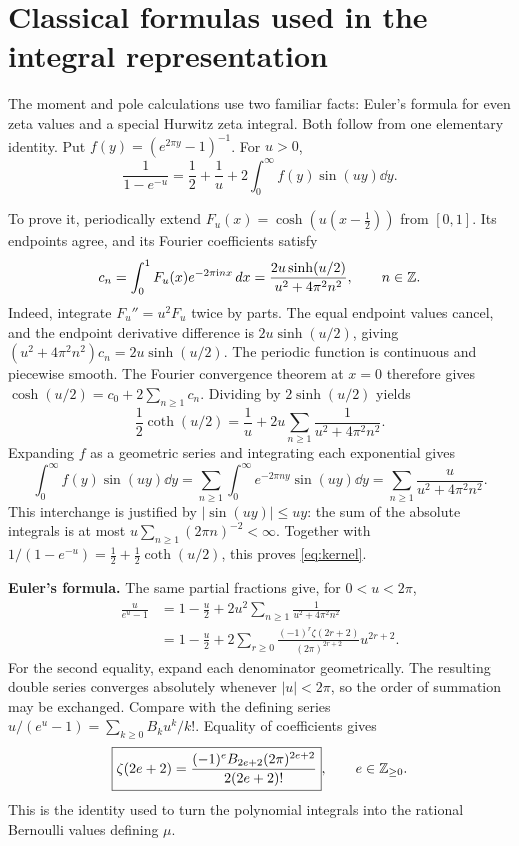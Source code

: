 \section{Classical formulas used in the integral representation}\label{app:classical}

The moment and pole calculations use two familiar facts: Euler's formula
for even zeta values and a special Hurwitz zeta integral. Both follow from
one elementary identity. Put $f(y)=(e^{2\pi y}-1)^{-1}$. For $u>0$,
\begin{equation}\label{eq:kernel}
 \frac1{1-e^{-u}}=\frac12+\frac1u
       +2\int_0^\infty f(y)\sin(uy)\dd y.
\end{equation}

To prove it, periodically extend
$F_u(x)=\cosh(u(x-\tfrac12))$ from $[0,1]$. Its endpoints agree,
and its Fourier coefficients satisfy
\[
 c_n=\int_0^1 F_u(x)e^{-2\pi\mathrm i nx}\,d x
     =\frac{2u\sinh(u/2)}{u^2+4\pi^2n^2},\qquad n\in\mathbb Z.
\]
Indeed, integrate $F_u''=u^2F_u$ twice by parts. The equal endpoint
values cancel, and the endpoint derivative difference is
$2u\sinh(u/2)$, giving
$(u^2+4\pi^2n^2)c_n=2u\sinh(u/2)$.
The periodic function is continuous and piecewise smooth. The Fourier
convergence theorem at $x=0$ therefore gives
$\cosh(u/2)=c_0+2\sum_{n\geq1}c_n$. Dividing by $2\sinh(u/2)$ yields
\[
 \frac12\coth(u/2)=\frac1u
      +2u\sum_{n\geq1}\frac1{u^2+4\pi^2n^2}.
\]
Expanding $f$ as a geometric series and integrating each exponential gives
\[
 \int_0^\infty f(y)\sin(uy)\dd y
 =\sum_{n\geq1}\int_0^\infty e^{-2\pi ny}\sin(uy)\dd y
 =\sum_{n\geq1}\frac{u}{u^2+4\pi^2n^2}.
\]
This interchange is justified by $|\sin(uy)|\leq uy$:
the sum of the absolute integrals is at most
$u\sum_{n\geq1}(2\pi n)^{-2}<\infty$.
Together with $1/(1-e^{-u})=\tfrac12+\tfrac12\coth(u/2)$,
this proves \eqref{eq:kernel}.

\textbf{Euler's formula.}
The same partial fractions give, for $0<u<2\pi$,
\begin{align*}
 \frac{u}{e^u-1}
 &=1-\frac u2+2u^2\sum_{n\geq1}\frac1{u^2+4\pi^2n^2}\\
 &=1-\frac u2+
   2\sum_{r\geq0}\frac{(-1)^r\zeta(2r+2)}{(2\pi)^{2r+2}}u^{2r+2}.
\end{align*}
For the second equality, expand each denominator geometrically. The
resulting double series converges absolutely whenever $|u|<2\pi$, so
the order of summation may be exchanged. Compare with the defining
series $u/(e^u-1)=\sum_{k\geq0}B_ku^k/k!$. Equality of coefficients gives
\[
 \boxed{\zeta(2e+2)=
 \frac{(-1)^eB_{2e+2}(2\pi)^{2e+2}}{2(2e+2)!}},
 \qquad e\in\mathbb Z_{\geq0}.
\]
This is the identity used to turn the polynomial integrals into the
rational Bernoulli values defining $\mu$.


